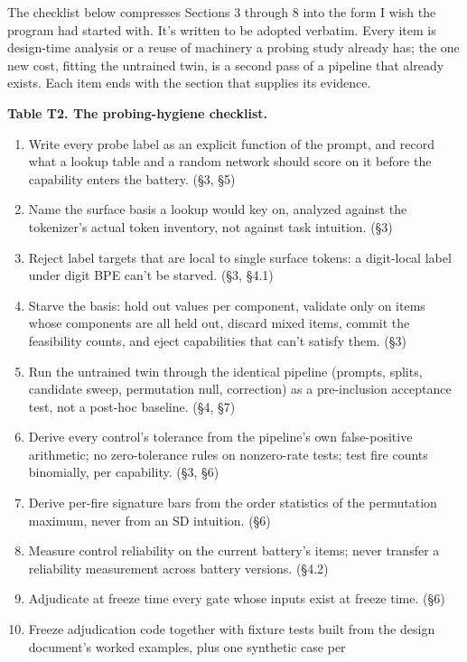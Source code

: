 The checklist below compresses Sections 3 through 8 into the form I
wish the program had started with. It's written to be adopted
verbatim. Every item is design-time analysis or a reuse of machinery a
probing study already has; the one new cost, fitting the untrained
twin, is a second pass of a pipeline that already exists. Each item
ends with the section that supplies its evidence.

\textbf{Table T2. The probing-hygiene checklist.}

\begin{enumerate}
\def\labelenumi{\arabic{enumi}.}
\tightlist
\item
  Write every probe label as an explicit function of the prompt, and
  record what a lookup table and a random network should score on it
  before the capability enters the battery. (§3, §5)
\item
  Name the surface basis a lookup would key on, analyzed against the
  tokenizer's actual token inventory, not against task intuition.
  (§3)
\item
  Reject label targets that are local to single surface tokens: a
  digit-local label under digit BPE can't be starved. (§3, §4.1)
\item
  Starve the basis: hold out values per component, validate only on
  items whose components are all held out, discard mixed items,
  commit the feasibility counts, and eject capabilities that can't
  satisfy them. (§3)
\item
  Run the untrained twin through the identical pipeline (prompts,
  splits, candidate sweep, permutation null, correction) as a
  pre-inclusion acceptance test, not a post-hoc baseline. (§4, §7)
\item
  Derive every control's tolerance from the pipeline's own
  false-positive arithmetic; no zero-tolerance rules on nonzero-rate
  tests; test fire counts binomially, per capability. (§3, §6)
\item
  Derive per-fire signature bars from the order statistics of the
  permutation maximum, never from an SD intuition. (§6)
\item
  Measure control reliability on the current battery's items; never
  transfer a reliability measurement across battery versions. (§4.2)
\item
  Adjudicate at freeze time every gate whose inputs exist at freeze
  time. (§6)
\item
  Freeze adjudication code together with fixture tests built from
  the design document's worked examples, plus one synthetic case per

\end{enumerate}
